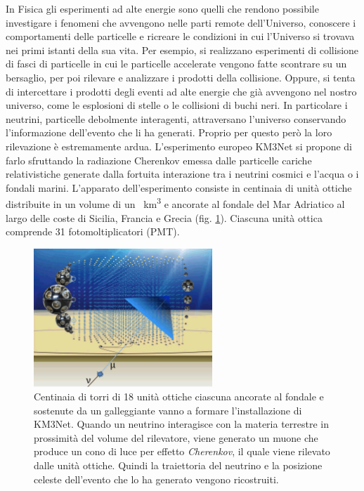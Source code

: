 \documentclass[../main.tex]{subfiles}
\begin{document}
In Fisica gli esperimenti ad alte energie sono quelli che rendono possibile investigare i fenomeni che avvengono nelle parti remote dell'Universo, conoscere i comportamenti delle particelle e ricreare le condizioni in cui l'Universo si trovava nei primi istanti della sua vita. Per esempio, si realizzano esperimenti di collisione di fasci di particelle in cui le particelle accelerate vengono fatte scontrare su un bersaglio, per poi rilevare e analizzare i prodotti della collisione. Oppure, si tenta di intercettare i prodotti degli eventi ad alte energie che già avvengono nel nostro universo, come le esplosioni di stelle o le collisioni di buchi neri. In particolare i neutrini, particelle debolmente interagenti, attraversano l'universo conservando l'informazione dell'evento che li ha generati. Proprio per questo però la loro rilevazione è estremamente ardua. L'esperimento europeo KM3Net si propone di farlo sfruttando la radiazione Cherenkov emessa dalle particelle cariche relativistiche generate dalla fortuita interazione tra i neutrini cosmici e l'acqua o i fondali marini. L'apparato dell'esperimento consiste in centinaia di unità ottiche distribuite in un volume di un \SI{}{\km ^3} e ancorate al fondale del Mar Adriatico al largo delle coste di Sicilia, Francia e Grecia (fig. \ref{fig:towers}). Ciascuna unità ottica comprende 31 fotomoltiplicatori (PMT).

\begin{figure}[tb]
    \centering
    \includegraphics[width=0.6\textwidth]{KM3NetTowers.png}
    \caption{\small Centinaia di torri di 18 unità ottiche ciascuna ancorate al fondale e sostenute da un galleggiante vanno a formare l'installazione di KM3Net. Quando un neutrino interagisce con la materia terrestre in prossimità del volume del rilevatore, viene generato un muone che produce un cono di luce per effetto \emph{Cherenkov}, il quale viene rilevato dalle unità ottiche. Quindi la traiettoria del neutrino e la posizione celeste dell'evento che lo ha generato vengono ricostruiti.
    \cite{km3}}
    \label{fig:towers}
\end{figure}
\end{document}
